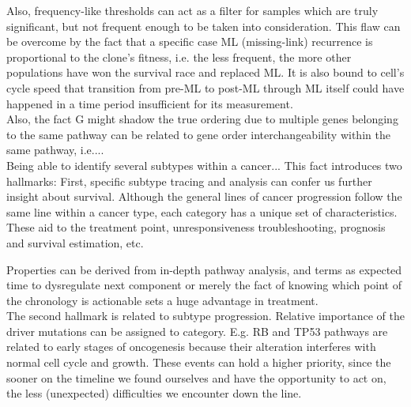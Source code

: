 Also, frequency-like thresholds can act as a filter for samples which are truly significant, but not frequent enough to be taken into consideration. This flaw can be overcome by the fact that a specific case ML (missing-link) recurrence is proportional to the clone's fitness, i.e. the less frequent, the more other populations have won the survival race and replaced ML. It is also bound to cell's cycle speed that transition from pre-ML to post-ML through ML itself could have happened in a time period insufficient for its measurement.
\\

Also, the fact G might shadow the true ordering due to multiple genes belonging to the same pathway can be related to gene order interchangeability within the same pathway, i.e....
\\

Being able to identify several subtypes within a cancer...
This fact introduces two hallmarks: First, specific subtype tracing and analysis can confer us further insight about survival. Although the general lines of cancer progression follow the same line within a cancer type, each category has a unique set of characteristics. These aid to the treatment point, unresponsiveness troubleshooting, prognosis and survival estimation, etc.

Properties can be derived from in-depth pathway analysis, and terms as expected time to dysregulate next component or merely the fact of knowing which point of the chronology is actionable sets a huge advantage in treatment.
\\

The second hallmark is related to subtype progression. Relative importance of the driver mutations can be assigned to category. E.g. RB and TP53 pathways are related to early stages of oncogenesis because their alteration interferes with normal cell cycle and growth. These events can hold a higher priority, since the sooner on the timeline we found ourselves and have the opportunity to act on, the less (unexpected) difficulties we encounter down the line.